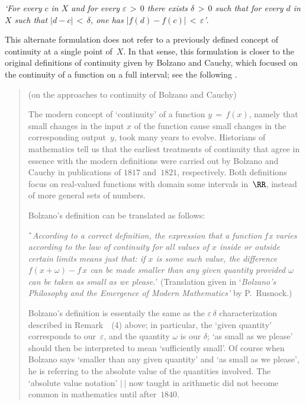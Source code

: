\VA

        \h {\em `For every $c$ in $X$ and for every ${\varepsilon}\,>\,0$ there exists ${\delta}\,>\,0$
    such that for every $d$ in $X$ such that $|d-c|\,<\,{\delta}$, one has $|f(d)-f(c)|\,<\,{\varepsilon}$'}.

\VA

        This alternate formulation does not refer to a previously defined concept of continuity at a single point of~$X$.
    In that sense, this formulation is closer to the original definitions of continuity given by Bolzano and Cauchy,
    which focused on the continuity of a function on a full interval; see the following \Note.

\VV

\begin{quotation}
{\footnotesize \underline{\Note} (on the approaches to continuity of Bolzano and Cauchy)

\V

        The modern concept of `continuity' of a function $y \,=\, f(x)$, namely that small changes in the input $x$ of the function cause small changes in the corresponding output~$y$,
    took many years to evolve. Historians of mathematics tell us that the earliest treatments of continuity
    that agree in essence with the modern definitions were carried out by Bolzano and Cauchy in publications of $1817$ and~$1821$, respectively.
    Both definitions focus on real-valued functions with domain some intervals in~${\RR}$, instead of more general sets of numbers.

        Bolzano's definition can be translated as follows:

\VA

       \h `{\em According to a correct definition, the expression that a function {\em f\,x}
    varies according to the law of continuity for all values of $x$ inside or outside certain limits means just that:
    if $x$ is some such value, the difference $f(x+{\omega})-f\,x$ can be made smaller than any given quantity provided
    ${\omega}$ can be taken as small as we please.}' (Translation given in `{\em Bolzano's Philosophy and the Emergence of Modern Mathematics'} by P.~Rusnock.)

\VA

 Bolzano's definition is essentaily the same as the ${\varepsilon}\,{\delta}$ characterization described in Remark~~(4) above;
    in particular,  the `given quantity' corresponds to our~${\varepsilon}$, and the quantity ${\omega}$ is our ${\delta}$; `as small as we please' should then be interpreted to mean `sufficiently small'. Of course when Bolzano says
    `smaller than any given quantity' and `as small as we please', he is referring to the absolute value of the quantities involved.
    The `absolute value notation' $|\,|$ now taught in arithmetic did not become common in mathematics until after~$1840$.


}
\end{quotation}
